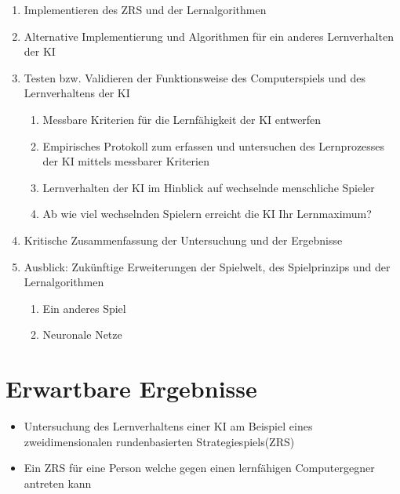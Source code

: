 \documentclass[12pt,a4paper]{scrartcl}
\begin{document}
\begin{enumerate}
	\item Implementieren des ZRS und der Lernalgorithmen
	
	\item Alternative Implementierung und Algorithmen für ein anderes Lernverhalten der KI
	
	\item Testen bzw. Validieren der Funktionsweise des Computerspiels und des Lernverhaltens der KI
	\begin{enumerate}
		\item Messbare Kriterien für die Lernfähigkeit der KI entwerfen
		\item Empirisches Protokoll zum erfassen und untersuchen des Lernprozesses der KI mittels messbarer Kriterien
		\item Lernverhalten der KI im Hinblick auf wechselnde menschliche Spieler
		\item Ab wie viel wechselnden Spielern erreicht die KI Ihr Lernmaximum?
	\end{enumerate}
	
	\item Kritische Zusammenfassung der Untersuchung und der Ergebnisse
	
	\item Ausblick: Zukünftige Erweiterungen der Spielwelt, des Spielprinzips und der Lernalgorithmen
	\begin{enumerate}
		\item Ein anderes Spiel
		\item Neuronale Netze
	\end{enumerate}
	
\end{enumerate}

\section*{Erwartbare Ergebnisse}
\begin{itemize}
	\item Untersuchung des Lernverhaltens einer KI am Beispiel eines zweidimensionalen rundenbasierten Strategiespiels(ZRS)
	\item Ein ZRS für eine Person welche gegen einen lernfähigen Computergegner antreten kann 
\end{itemize}
\end{document}
